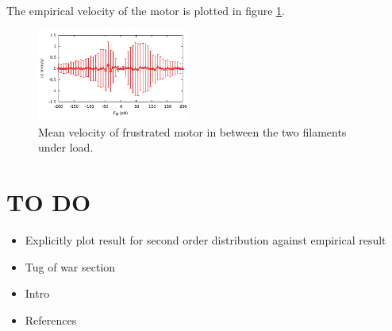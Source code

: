 \documentclass[aps,pre,twocolumn,showpacs,showkeys]{revtex4-1}
\begin{document}
The empirical velocity of the motor is plotted in figure \ref{Fig: tug_F_motor}. 

\begin{figure}[t]
\centering
\includegraphics[width=0.45\textwidth,height=!]{tug_F_motor}
\caption{Mean velocity of frustrated motor in between the two filaments under load.} %
\label{Fig: tug_F_motor}
\end{figure}

\newpage
\section{TO DO}
\begin{itemize}
\item Explicitly plot result for second order distribution against empirical result
\item Tug of war section
\item Intro
\item References
\end{itemize}



\end{document}
